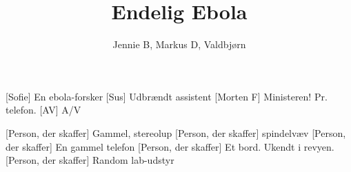 \documentclass[a4paper,11pt]{article}
\title{Endelig Ebola}
\author{Jennie B, Markus D, Valdbjørn}
\begin{document}
\maketitle

\begin{roles}
    [Sofie] En ebola-forsker
    [Sus] Udbrændt assistent
    [Morten F] Ministeren! Pr. telefon.
    [AV] A/V
\end{roles}

\begin{props}
    [Person, der skaffer] Gammel, stereolup
    [Person, der skaffer] spindelvæv
    [Person, der skaffer] En gammel telefon
    [Person, der skaffer] Et bord. Ukendt i revyen.
    [Person, der skaffer] Random lab-udstyr
\end{props}
\end{document}
